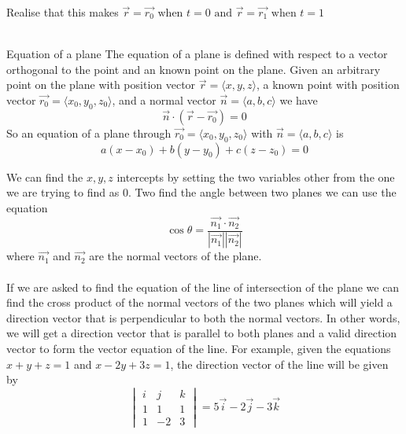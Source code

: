 \documentclass{article}
\begin{document}
	Realise that this makes
	$\vec{r}= \vec{r_0}\text{ when }t = 0 \text{ and }\vec{r}= \vec{r_1}\text{ when
	}t = 1$
	\\ \\
	\begin{mybox}
		{Equation of a plane} The equation of a plane is defined with respect to a vector
		orthogonal to the point and an known point on the plane. Given an arbitrary
		point on the plane with position vector $\vec{r}= \langle x,y,z \rangle$, a known
		point with position vector $\vec{r_0}= \langle x_{0},y_{0},z_{0} \rangle$,
		and a normal vector $\vec{n}= \langle a,b,c \rangle$ we have
		\[
			\vec{n}\cdot (\vec{r}-\vec{r_0}) = 0
		\]
		So an equation of a plane through
		$\vec{r_0}= \langle x_{0},y_{0},z_{0} \rangle$ with
		$\vec{n}= \langle a,b,c \rangle$ is
		\[
			a(x-x_{0})+b(y-y_{0})+c(z-z_{0}) = 0
		\]
	\end{mybox}
	We can find the $x,y,z$ intercepts by setting the two variables other from the
	one we are trying to find as 0. Two find the angle between two planes we can
	use the equation
	\[
		\cos{\theta}= \frac{\vec{n_1} \cdot \vec{n_2} }{|\vec{n_1}||\vec{n_2}|}
	\]
	where $\vec{n_1}$ and $\vec{n_2}$ are the normal vectors of the plane. \\ \\ If
	we are asked to find the equation of the line of intersection of the plane we can
	find the cross product of the normal vectors of the two planes which will yield
	a direction vector that is perpendicular to both the normal vectors. In other
	words, we will get a direction vector that is parallel to both planes and a valid
	direction vector to form the vector equation of the line. For example, given the
	equations $x+y+z =1$ and $x-2y+3z=1$, the direction vector of the line will be
	given by
	\[
		\begin{vmatrix}
			i & j  & k \\
			1 & 1  & 1 \\
			1 & -2 & 3
		\end{vmatrix}
		= 5\vec{i}- 2\vec{j}- 3\vec{k}
	\]
\end{document}
